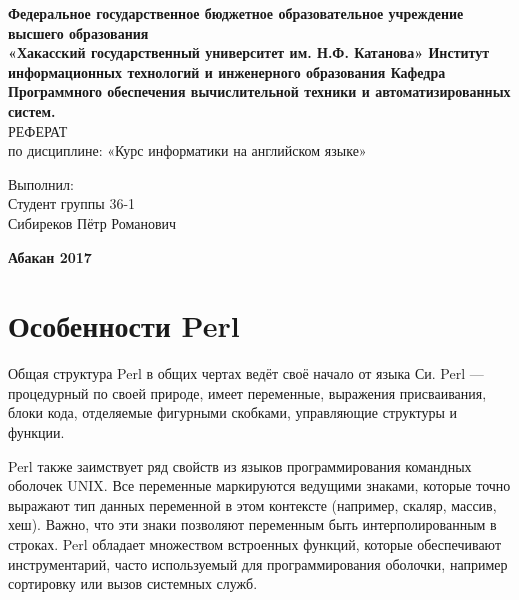 \documentclass[14pt,article]{scrartcl}
\begin{document}

\begin{center}
\normalsize \textbf{Федеральное государственное бюджетное образовательное учреждение
высшего образования\\
«Хакасский государственный университет им. Н.Ф. Катанова»
Институт информационных технологий и инженерного образования
Кафедра Программного обеспечения вычислительной техники и
автоматизированных систем.}\\ 
\hfill \break
\hfill \break
\hfill \break
\hfill \break
\large{РЕФЕРАТ}\\
\hfill\break
\large{по дисциплине:
«Курс информатики на английском языке»}\\
\hfill \break
\hfill \break
\hfill \break

\hfill \break
\hfill \break
\end{center}

\hfill 
\hfill \break
\hfill \break
\hfill \break
\hfill \break
\hfill \break
\hfill \break
\begin{flushright}
 Выполнил:  \\ Студент группы 36-1 \\
 Сибиреков Пётр Романович
\end{flushright}
\hfill \break
\hfill \break
\hfill \break
\hfill \break


\begin{center} \small{\bf Абакан 2017}  \end{center}
\thispagestyle{empty} %

\section*{Особенности Perl}
\onehalfspacing
Общая структура Perl в общих чертах ведёт своё начало от языка Си. Perl — процедурный по своей природе, имеет переменные, выражения присваивания, блоки кода, отделяемые фигурными скобками, управляющие структуры и функции.

Perl также заимствует ряд свойств из языков программирования командных оболочек UNIX. Все переменные маркируются ведущими знаками, которые точно выражают тип данных переменной в этом контексте (например, скаляр, массив, хеш). Важно, что эти знаки позволяют переменным быть интерполированным в строках. Perl обладает множеством встроенных функций, которые обеспечивают инструментарий, часто используемый для программирования оболочки, например сортировку или вызов системных служб.
\end{document}
